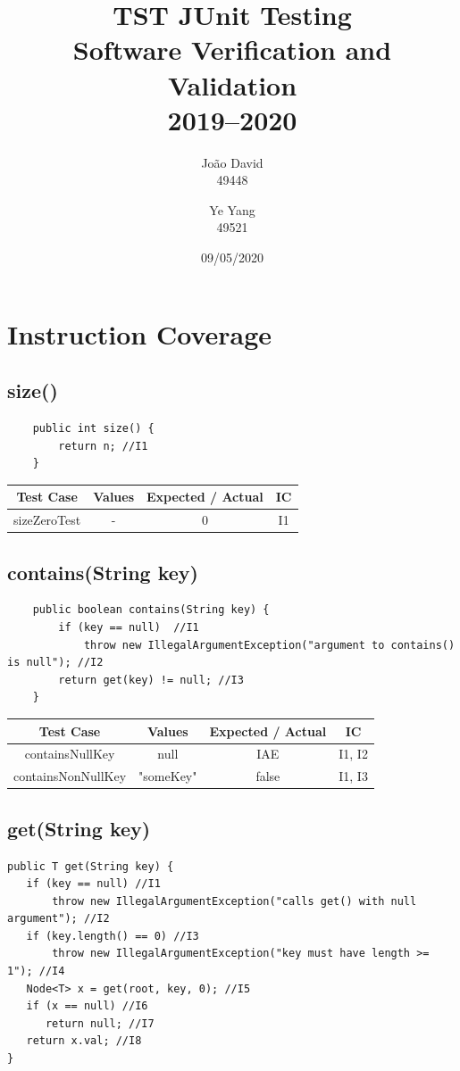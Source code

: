 \documentclass[12pt]{article}
\title{TST JUnit Testing \\
  \Large Software Verification and Validation \\ 2019--2020
}
\author{
  João David\\49448
  \and
  Ye Yang\\49521
}
\date{09/05/2020}
\begin{document}
\maketitle
\newpage
\tableofcontents
\newpage
\section[Instruction Coverage]{Instruction Coverage}
\subsection{size()}
\begin{lstlisting}
    public int size() {
        return n; //I1
    }
\end{lstlisting}

\begin{table}[htb]
\centering
\begin{tabular}{| c | c | c | c |} 
 \hline
 Test Case & Values & Expected / Actual & IC\\ \hline
 sizeZeroTest & - & 0 & I1 \\ \hline

\end{tabular}
\end{table}

\subsection{contains(String key)}
\begin{lstlisting}
    public boolean contains(String key) {
        if (key == null)  //I1
            throw new IllegalArgumentException("argument to contains() is null"); //I2
        return get(key) != null; //I3
    }
\end{lstlisting}

\begin{table}[htb]
\centering
\begin{tabular}{| c | c | c | c |} 
 \hline
 Test Case & Values & Expected / Actual & IC\\ \hline
 containsNullKey & null & IAE & I1, I2 \\ \hline
 containsNonNullKey & "someKey" & false & I1, I3 \\ \hline
\end{tabular}
\end{table}

\subsection{get(String key)}
\begin{lstlisting}
public T get(String key) {
   if (key == null) //I1
       throw new IllegalArgumentException("calls get() with null argument"); //I2
   if (key.length() == 0) //I3
       throw new IllegalArgumentException("key must have length >= 1"); //I4
   Node<T> x = get(root, key, 0); //I5
   if (x == null) //I6
      return null; //I7
   return x.val; //I8
}
\end{lstlisting}
\end{document}
